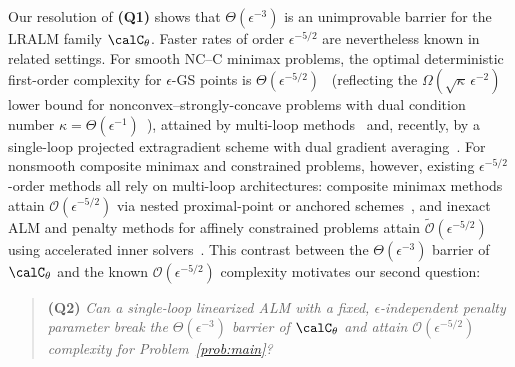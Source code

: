 Our resolution of \textbf{(Q1)} shows that $\Theta(\epsilon^{-3})$ is an
unimprovable barrier for the LRALM family $\calC_\theta$. Faster rates of order
$\epsilon^{-5/2}$ are nevertheless known in related settings. For smooth NC--C
minimax problems, the optimal deterministic first-order complexity for
$\epsilon$-GS points is $\Theta(\epsilon^{-5/2})$~\cite{pan2026optimal}
(reflecting the $\Omega(\sqrt{\kappa}\,\epsilon^{-2})$ lower bound for
nonconvex--strongly-concave problems with dual condition number
$\kappa=\Theta(\epsilon^{-1})$~\cite{zhang2021complexity,li2021complexity}),
attained by multi-loop methods~\cite{pan2026optimal} and, recently, by a
single-loop projected extragradient scheme with dual gradient
averaging~\cite{zhang2026matching}. For nonsmooth composite minimax and
constrained problems, however, existing $\epsilon^{-5/2}$-order methods all
rely on multi-loop architectures: composite minimax methods attain
$\mathcal O(\epsilon^{-5/2})$ via nested proximal-point or anchored
schemes~\cite{kong2021accelerated,ke2026efficient}, and inexact ALM and penalty
methods for affinely constrained problems attain
$\widetilde{\mathcal O}(\epsilon^{-5/2})$ using accelerated inner
solvers~\cite{li2021rate,lin2022complexity,kong2023iteration}. This contrast
between the $\Theta(\epsilon^{-3})$ barrier of $\calC_\theta$ and the known
$\mathcal O(\epsilon^{-5/2})$ complexity motivates our second question:
\begin{quote}
  \textbf{(Q2)}
  \emph{Can a single-loop linearized ALM with a fixed, $\epsilon$-independent
  penalty parameter break the $\Theta(\epsilon^{-3})$ barrier of $\calC_\theta$
  and attain $\mathcal O(\epsilon^{-5/2})$ complexity for
  Problem~\eqref{prob:main}?}
\end{quote}

